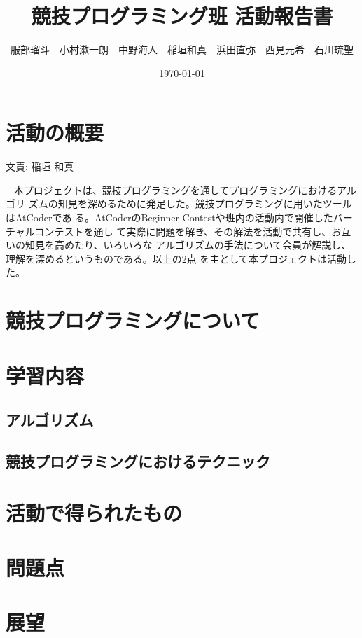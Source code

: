 \documentclass[11pt,a4paper]{jsarticle}
\title{競技プログラミング班 活動報告書}
\author{服部瑠斗　小村漱一朗　中野海人　稲垣和真　浜田直弥　西見元希　石川琉聖}
\date{\today}
\newcommand{\writtenBy}[1]{\begin{flushright}文責: #1\end{flushright}~}
\begin{document}
\maketitle
%
%
\section{活動の概要}
\writtenBy{稲垣 和真}
本プロジェクトは、競技プログラミングを通してプログラミングにおけるアルゴリ
ズムの知見を深めるために発足した。競技プログラミングに用いたツールはAtCoderであ
る。AtCoderのBeginner Contestや班内の活動内で開催したバーチャルコンテストを通し
て実際に問題を解き、その解法を活動で共有し、お互いの知見を高めたり、いろいろな
アルゴリズムの手法について会員が解説し、理解を深めるというものである。以上の2点
を主として本プロジェクトは活動した。

\section{競技プログラミングについて}
\section{学習内容}
\subsection{アルゴリズム}
\subsection{競技プログラミングにおけるテクニック}
\section{活動で得られたもの}
\section{問題点}
\section{展望}


%
%
\end{document}
